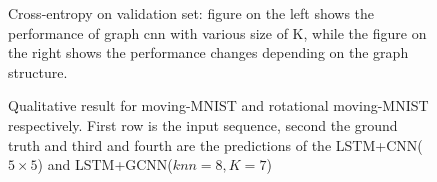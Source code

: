 \documentclass{article} %
\begin{document}
\begin{figure}[t]
	\centering
	\hfill
	\caption{Cross-entropy on validation set: figure on the left shows the performance of graph cnn with various size of K, while the figure on the right shows the performance changes depending on the graph structure.}
	\label{mMNIST_graph}
\end{figure}

\begin{figure}[t]
	\centering
	\hfill
	\caption{Qualitative result for moving-MNIST and rotational moving-MNIST respectively. First row is the input sequence, second the ground truth and third and fourth are the predictions of the LSTM+CNN($5\times5$) and LSTM+GCNN($knn=8, K=7$)}
	\label{mMNIST_img}
\end{figure}
\end{document}
